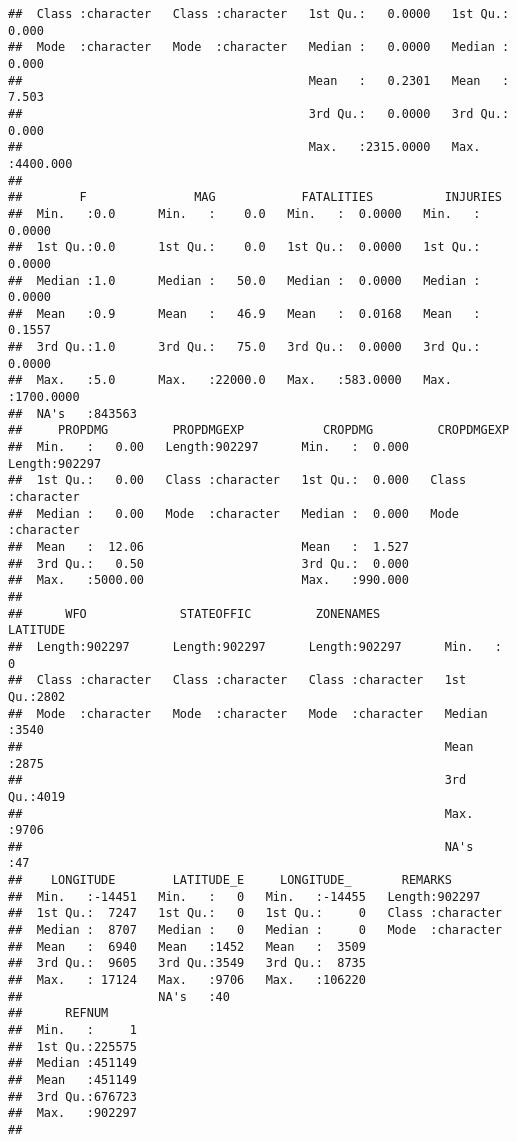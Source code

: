 \documentclass[
]{article}
\begin{document}
\begin{verbatim}
##  Class :character   Class :character   1st Qu.:   0.0000   1st Qu.:   0.000  
##  Mode  :character   Mode  :character   Median :   0.0000   Median :   0.000  
##                                        Mean   :   0.2301   Mean   :   7.503  
##                                        3rd Qu.:   0.0000   3rd Qu.:   0.000  
##                                        Max.   :2315.0000   Max.   :4400.000  
##                                                                              
##        F               MAG            FATALITIES          INJURIES        
##  Min.   :0.0      Min.   :    0.0   Min.   :  0.0000   Min.   :   0.0000  
##  1st Qu.:0.0      1st Qu.:    0.0   1st Qu.:  0.0000   1st Qu.:   0.0000  
##  Median :1.0      Median :   50.0   Median :  0.0000   Median :   0.0000  
##  Mean   :0.9      Mean   :   46.9   Mean   :  0.0168   Mean   :   0.1557  
##  3rd Qu.:1.0      3rd Qu.:   75.0   3rd Qu.:  0.0000   3rd Qu.:   0.0000  
##  Max.   :5.0      Max.   :22000.0   Max.   :583.0000   Max.   :1700.0000  
##  NA's   :843563                                                           
##     PROPDMG         PROPDMGEXP           CROPDMG         CROPDMGEXP       
##  Min.   :   0.00   Length:902297      Min.   :  0.000   Length:902297     
##  1st Qu.:   0.00   Class :character   1st Qu.:  0.000   Class :character  
##  Median :   0.00   Mode  :character   Median :  0.000   Mode  :character  
##  Mean   :  12.06                      Mean   :  1.527                     
##  3rd Qu.:   0.50                      3rd Qu.:  0.000                     
##  Max.   :5000.00                      Max.   :990.000                     
##                                                                           
##      WFO             STATEOFFIC         ZONENAMES            LATITUDE   
##  Length:902297      Length:902297      Length:902297      Min.   :   0  
##  Class :character   Class :character   Class :character   1st Qu.:2802  
##  Mode  :character   Mode  :character   Mode  :character   Median :3540  
##                                                           Mean   :2875  
##                                                           3rd Qu.:4019  
##                                                           Max.   :9706  
##                                                           NA's   :47    
##    LONGITUDE        LATITUDE_E     LONGITUDE_       REMARKS         
##  Min.   :-14451   Min.   :   0   Min.   :-14455   Length:902297     
##  1st Qu.:  7247   1st Qu.:   0   1st Qu.:     0   Class :character  
##  Median :  8707   Median :   0   Median :     0   Mode  :character  
##  Mean   :  6940   Mean   :1452   Mean   :  3509                     
##  3rd Qu.:  9605   3rd Qu.:3549   3rd Qu.:  8735                     
##  Max.   : 17124   Max.   :9706   Max.   :106220                     
##                   NA's   :40                                        
##      REFNUM      
##  Min.   :     1  
##  1st Qu.:225575  
##  Median :451149  
##  Mean   :451149  
##  3rd Qu.:676723  
##  Max.   :902297  
## 
\end{verbatim}
\end{document}
